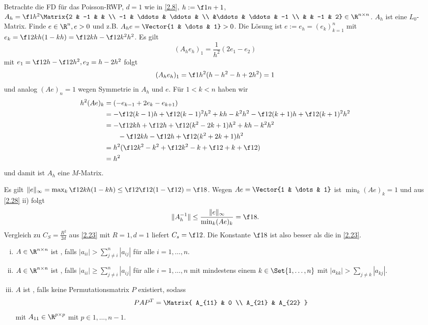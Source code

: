 \begin{ex*}
	Betrachte die FD für das Poisson-RWP, $d = 1$ wie in \ref{2.8}, $h := \f 1{n+1}$, $A_h = \f 1{h^2} \Matrix{2 & -1 &  & \\ -1 & \ddots & \ddots & \\ &\ddots & \ddots & -1 \\ & & -1 & 2} \in \R^{n\times n}$.
	$A_h$ ist eine $L_0$-Matrix.
	Finde $e \in \R^n, e > 0$ und z.B. $A_h e = \Vector{1 & \dots & 1} > 0$.
	Die Lösung ist $e := e_h = (e_k)_{k=1}^n$ mit $e_k = \f 12 k h  (1-kh) = \f 12 kh - \f 12 k^2h^2$.
	Es gilt
	\[
		(A_h e_h)_1 = \frac{1}{h^2} (2e_1 - e_2)
	\]
	mit $e_1 = \f 12 h - \f 12 h^2, e_2 = h - 2h^2$ folgt
	\[
		(A_h e_h)_1 = \f 1{h^2}(h - h^2 - h + 2h^2) = 1
	\]
	und analog $(Ae)_n = 1$ wegen Symmetrie in $A_h$ und $e$.
	Für $1 < k < n$ haben wir
	\begin{align*}
		h^2 (Ae)_k
		&= (-e_{k-1} + 2e_k - e_{k+1}) \\
		&= -\f 12 (k-1)h + \f 12(k-1)^2 h^2 + kh -k^2 h^2 - \f 12 (k+1)h + \f 12 (k+1)^2 h^2 \\
		&= -\f 12 kh + \f 12 h + \f 12(k^2 - 2k + 1)h^2 + kh - k^2h^2 \\
		&\qquad - \f 12 kh - \f 12 h + \f 12 (k^2 + 2k+1)h^2 \\
		&= h^2( \f 12 k^2 - k^2 + \f 12 k^2 - k + \f 12 + k + \f 12) \\
		&= h^2
	\end{align*}
	und damit ist $A_h$ eine $M$-Matrix.

	Es gilt $\|e\|_\infty = \max_k \f 12 kh(1-kh) \le \f 12 \f 12 ( 1 - \f 12) = \f 18$.
	Wegen $Ae = \Vector{1 & \dots & 1}$ ist $\min_k (Ae)_k = 1$ und aus \ref{2.28} ii) folgt
	\[
		\|A_h^{-1}\| \le \frac{\|e\|_\infty}{\min_k (Ae)_k} = \f 18.
	\]
	Vergleich zu $C_S = \frac{R^2}{2d}$ aus \ref{2.23} mit $R = 1, d=1$ liefert $C_s = \f 12$.
	Die Konstante $\f 18$ ist also besser als die in \ref{2.23}.
\end{ex*}

\begin{df}
	\begin{enumerate}[i)]
		\item
			$A \in \R^{n\times n}$ ist , falls $|a_{ii}| > \sum_{j \neq i}^n |a_{ij}|$ für alle $i = 1, \dotsc, n$.
		\item
			$A \in \R^{n\times n}$ ist , falls $|a_{ii}| \ge \sum_{j \neq i}^n |a_{ij}|$ für alle $i = 1, \dotsc, n$ mit mindestens einem $k \in \Set{1,\dotsc, n}$ mit $|a_{kk}| > \sum_{j \neq k} |a_{kj}|$.
		\item
			$A$ ist , falls keine Permutationsmatrix $P$ existiert, sodass
			\[
				P A P^T = \Matrix{ A_{11} & 0 \\ A_{21} & A_{22} }
			\]
			mit $A_{11} \in \R^{p\times p}$ mit $p \in {1, \dotsc, n-1}$.
	\end{enumerate}
\end{df}

